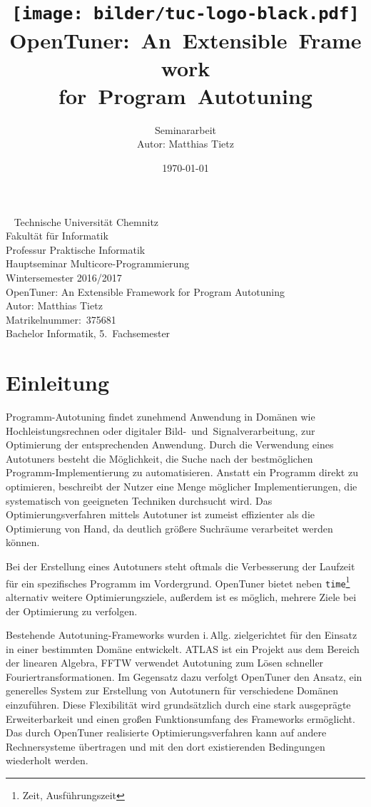 \documentclass[a4paper,11pt]{scrartcl}
\title{\texttt{[image: bilder/tuc-logo-black.pdf]}
    OpenTuner:~An~Extensible~Framework\\for~Program~Autotuning
}
\author{Seminararbeit\\Autor: Matthias Tietz}
\date{\today}
\newcommand{\iAllg}{\mbox{i.\,Allg.}\xspace}
\begin{document}
\maketitle \thispagestyle{empty} \newpage

\thispagestyle{empty}
~
\vfill
Technische Universität Chemnitz\\
Fakultät für Informatik\\
Professur Praktische Informatik\\
Hauptseminar Multicore-Programmierung\\
Wintersemester 2016/2017\\

OpenTuner: An Extensible Framework for Program Autotuning\\
Autor: Matthias Tietz\\
Matrikelnummer:~375681\\
Bachelor Informatik, 5.~Fachsemester

\newpage
\tableofcontents \newpage



\section{Einleitung}

Programm-Autotuning findet zunehmend Anwendung in Domänen wie Hochleistungsrechnen oder
digitaler Bild-~und~Signalverarbeitung, zur Optimierung der entsprechenden Anwendung.
Durch die Verwendung eines Autotuners besteht die Möglichkeit, die Suche nach der
bestmöglichen Programm-Implementierung zu automatisieren. Anstatt ein Programm direkt
zu optimieren, beschreibt der Nutzer eine Menge möglicher Implementierungen, die 
systematisch von geeigneten Techniken durchsucht wird. Das Optimierungsverfahren
mittels Autotuner ist zumeist effizienter als die Optimierung von Hand, da deutlich größere
Suchräume verarbeitet werden können. \newline

Bei der Erstellung eines Autotuners steht oftmals die Verbesserung der Laufzeit
für ein spezifisches Programm im Vordergrund. OpenTuner bietet neben \texttt{time}\footnote{Zeit, Ausführungszeit}  
alternativ weitere Optimierungsziele, außerdem ist es möglich, mehrere Ziele bei der Optimierung 
zu verfolgen. \newline


Bestehende Autotuning-Frameworks wurden \iAllg zielgerichtet für den Einsatz in einer 
bestimmten Domäne entwickelt. \textsc{ATLAS} \cite{atlas} ist ein Projekt aus dem Bereich der linearen Algebra,
\textsc{FFTW} \cite{fftw} verwendet Autotuning zum Lösen schneller Fouriertransformationen.
Im Gegensatz dazu verfolgt OpenTuner den Ansatz, ein generelles System zur Erstellung 
von Autotunern für verschiedene Domänen einzuführen. Diese Flexibilität wird grundsätzlich durch eine stark
ausgeprägte Erweiterbarkeit und einen großen Funktionsumfang des Frameworks ermöglicht.
Das durch OpenTuner realisierte Optimierungsverfahren kann auf andere Rechnersysteme übertragen
und mit den dort existierenden Bedingungen wiederholt werden. \newline
\end{document}
